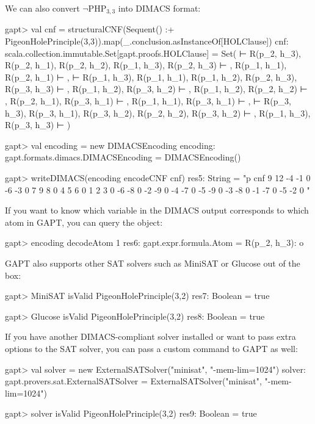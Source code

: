 \documentclass[a4paper,11pt]{book}
\newcommand{\cli}[1]{{\ttfamily {#1}}}
\begin{document}
We can also convert $\neg\mathrm{PHP}_{3,3}$ into DIMACS format:
\begin{clilisting}
gapt> val cnf = structuralCNF(Sequent() :+ PigeonHolePrinciple(3,3)).map(_.conclusion.asInstanceOf[HOLClause])
cnf: scala.collection.immutable.Set[gapt.proofs.HOLClause] = Set( ⊢ R(p_2, h_3), R(p_2, h_1), R(p_2, h_2), R(p_1, h_3), R(p_2, h_3) ⊢ , R(p_1, h_1), R(p_2, h_1) ⊢ ,  ⊢ R(p_1, h_3), R(p_1, h_1), R(p_1, h_2), R(p_2, h_3), R(p_3, h_3) ⊢ , R(p_1, h_2), R(p_3, h_2) ⊢ , R(p_1, h_2), R(p_2, h_2) ⊢ , R(p_2, h_1), R(p_3, h_1) ⊢ , R(p_1, h_1), R(p_3, h_1) ⊢ ,  ⊢ R(p_3, h_3), R(p_3, h_1), R(p_3, h_2), R(p_2, h_2), R(p_3, h_2) ⊢ , R(p_1, h_3), R(p_3, h_3) ⊢ )

gapt> val encoding = new DIMACSEncoding
encoding: gapt.formats.dimacs.DIMACSEncoding = DIMACSEncoding()

gapt> writeDIMACS(encoding encodeCNF cnf)
res5: String =
"p cnf 9 12
-4 -1 0
-6 -3 0
7 9 8 0
4 5 6 0
1 2 3 0
-6 -8 0
-2 -9 0
-4 -7 0
-5 -9 0
-3 -8 0
-1 -7 0
-5 -2 0
"

\end{clilisting}

If you want to know which variable in the DIMACS output corresponds to which
atom in GAPT, you can query the \cli{DIMACSEncoding} object:
\begin{clilisting}
gapt> encoding decodeAtom 1
res6: gapt.expr.formula.Atom = R(p_2, h_3): o

\end{clilisting}

GAPT also supports other SAT solvers such as MiniSAT or Glucose out of the box:
\begin{clilisting}
gapt> MiniSAT isValid PigeonHolePrinciple(3,2)
res7: Boolean = true

\end{clilisting}
\begin{clilisting}
gapt> Glucose isValid PigeonHolePrinciple(3,2)
res8: Boolean = true

\end{clilisting}

If you have another DIMACS-compliant solver installed or want to pass extra
options to the SAT solver, you can pass a custom command to GAPT as well:
\begin{clilisting}
gapt> val solver = new ExternalSATSolver("minisat", "-mem-lim=1024")
solver: gapt.provers.sat.ExternalSATSolver = ExternalSATSolver("minisat", "-mem-lim=1024")

gapt> solver isValid PigeonHolePrinciple(3,2)
res9: Boolean = true

\end{clilisting}
\end{document}
